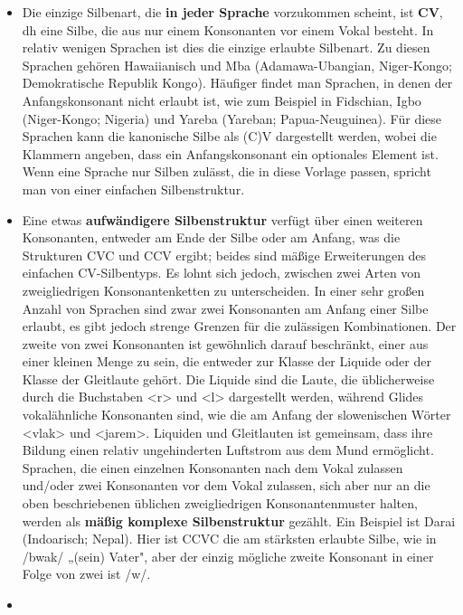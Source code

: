 \documentclass[
]{article}
\begin{document}
\begin{itemize}
\item
  Die einzige Silbenart, die \textbf{in jeder Sprache} vorzukommen scheint,
  ist \textbf{CV}, dh eine Silbe, die aus nur einem Konsonanten vor einem
  Vokal besteht. In relativ wenigen Sprachen ist dies die einzige
  erlaubte Silbenart. Zu diesen Sprachen gehören Hawaiianisch und Mba
  (Adamawa-Ubangian, Niger-Kongo; Demokratische Republik Kongo).
  Häufiger findet man Sprachen, in denen der Anfangskonsonant nicht
  erlaubt ist, wie zum Beispiel in Fidschian, Igbo (Niger-Kongo;
  Nigeria) und Yareba (Yareban; Papua-Neuguinea). Für diese Sprachen
  kann die kanonische Silbe als (C)V dargestellt werden, wobei die
  Klammern angeben, dass ein Anfangskonsonant ein optionales Element
  ist. Wenn eine Sprache nur Silben zulässt, die in diese Vorlage
  passen, spricht man von einer einfachen Silbenstruktur.
\item
  Eine etwas \textbf{aufwändigere Silbenstruktur} verfügt über einen
  weiteren Konsonanten, entweder am Ende der Silbe oder am Anfang, was
  die Strukturen CVC und CCV ergibt; beides sind mäßige Erweiterungen
  des einfachen CV-Silbentyps. Es lohnt sich jedoch, zwischen zwei
  Arten von zweigliedrigen Konsonantenketten zu unterscheiden. In
  einer sehr großen Anzahl von Sprachen sind zwar zwei Konsonanten am
  Anfang einer Silbe erlaubt, es gibt jedoch strenge Grenzen für die
  zulässigen Kombinationen. Der zweite von zwei Konsonanten ist
  gewöhnlich darauf beschränkt, einer aus einer kleinen Menge zu sein,
  die entweder zur Klasse der Liquide oder der Klasse der Gleitlaute
  gehört. Die Liquide sind die Laute, die üblicherweise durch die
  Buchstaben \textless r\textgreater{} und \textless l\textgreater{} dargestellt werden, während Glides
  vokalähnliche Konsonanten sind, wie die am Anfang der slowenischen
  Wörter \textless vlak\textgreater{} und \textless jarem\textgreater. Liquiden und Gleitlauten ist
  gemeinsam, dass ihre Bildung einen relativ ungehinderten Luftstrom
  aus dem Mund ermöglicht. Sprachen, die einen einzelnen Konsonanten
  nach dem Vokal zulassen und/oder zwei Konsonanten vor dem Vokal
  zulassen, sich aber nur an die oben beschriebenen üblichen
  zweigliedrigen Konsonantenmuster halten, werden als \textbf{mäßig komplexe
  Silbenstruktur} gezählt. Ein Beispiel ist Darai (Indoarisch;
  Nepal). Hier ist CCVC die am stärksten erlaubte Silbe, wie in /bwak/
  „(sein) Vater", aber der einzig mögliche zweite Konsonant in einer
  Folge von zwei ist /w/.
\item

\end{itemize}
\end{document}
